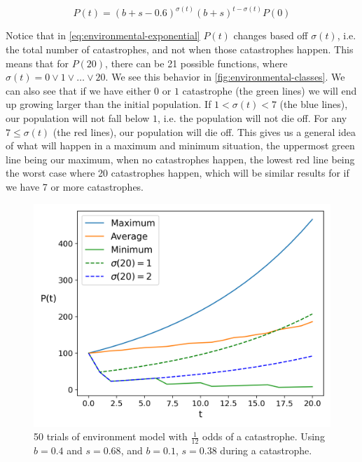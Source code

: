 \documentclass{article}
\begin{document}
\begin{equation} \label{eq:environmental-exponential}
    P(t) = (b+s-0.6)^{\sigma(t)}(b+s)^{t-\sigma(t)}P(0)
\end{equation}

Notice that in \cref{eq:environmental-exponential} $P(t)$ changes based off $\sigma(t)$, i.e. the total number of catastrophes, and not when those catastrophes happen. This means that for $P(20)$, there can be 21 possible functions, where $\sigma(t) = 0 \lor 1 \lor \ldots \lor 20$. We see this behavior in \cref{fig:environmental-classes}. We can also see that if we have either $0$ or $1$ catastrophe (the green lines) we will end up growing larger than the initial population. If $1 < \sigma(t) < 7$ (the blue lines), our population will not fall below $1$, i.e. the population will not die off. For any $7 \le \sigma(t)$ (the red lines), our population will die off. This gives us a general idea of what will happen in a maximum and minimum situation, the uppermost green line being our maximum, when no catastrophes happen, the lowest red line being the worst case where 20 catastrophes happen, which will be similar results for if we have 7 or more catastrophes.

\begin{figure}[h!]
    \centering
    \includegraphics[width=.5\linewidth]{plots/environmental.png}
    \caption{50 trials of environment model with $\frac{1}{12}$ odds of a catastrophe. Using $b = 0.4$ and $s = 0.68$, and $b = 0.1$, $s = 0.38$ during a catastrophe.}
    \label{fig:environmental}
\end{figure}
\end{document}
